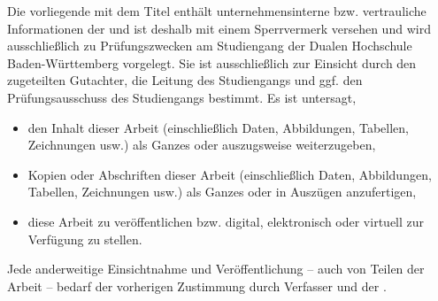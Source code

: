 Die vorliegende \sDocumentTypePhrase{} mit dem Titel \emph{\documentTitle}
enthält unternehmensinterne bzw. vertrauliche Informationen der 
\companyName{} und ist deshalb mit einem Sperrvermerk versehen und wird
ausschließlich zu Prüfungszwecken am Studiengang \department{} der Dualen
Hochschule Baden-Württemberg \locationUniversity{} vorgelegt.
Sie ist ausschließlich zur Einsicht durch den zugeteilten Gutachter, die
Leitung des Studiengangs und ggf. den Prüfungsausschuss des Studiengangs 
bestimmt.
Es ist untersagt,

\begin{itemize}
    \item den Inhalt dieser Arbeit (einschließlich Daten, Abbildungen, 
    Tabellen, Zeichnungen usw.) als Ganzes oder auszugsweise weiterzugeben,
    \item Kopien oder Abschriften dieser Arbeit (einschließlich Daten,
    Abbildungen, Tabellen, Zeichnungen usw.) als Ganzes oder in Auszügen
    anzufertigen,
    \item diese Arbeit zu veröffentlichen bzw. digital, elektronisch oder
    virtuell zur Verfügung zu stellen.
\end{itemize}

Jede anderweitige Einsichtnahme und Veröffentlichung -- auch von Teilen der
Arbeit -- bedarf der vorherigen Zustimmung durch
 Verfasser und der
\companyName{}.